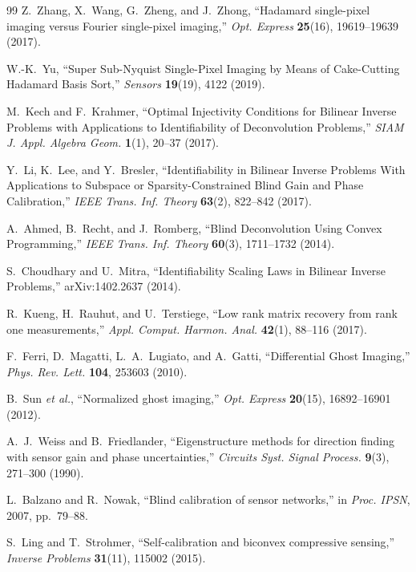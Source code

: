 \begin{thebibliography}{99}
Z.~Zhang, X.~Wang, G.~Zheng, and J.~Zhong, ``Hadamard single-pixel imaging versus Fourier single-pixel imaging,'' \emph{Opt. Express} \textbf{25}(16), 19619--19639 (2017).

W.-K.~Yu, ``Super Sub-Nyquist Single-Pixel Imaging by Means of Cake-Cutting Hadamard Basis Sort,'' \emph{Sensors} \textbf{19}(19), 4122 (2019).

M.~Kech and F.~Krahmer, ``Optimal Injectivity Conditions for Bilinear Inverse Problems with Applications to Identifiability of Deconvolution Problems,'' \emph{SIAM J. Appl. Algebra Geom.} \textbf{1}(1), 20--37 (2017).

Y.~Li, K.~Lee, and Y.~Bresler, ``Identifiability in Bilinear Inverse Problems With Applications to Subspace or Sparsity-Constrained Blind Gain and Phase Calibration,'' \emph{IEEE Trans. Inf. Theory} \textbf{63}(2), 822--842 (2017).

A.~Ahmed, B.~Recht, and J.~Romberg, ``Blind Deconvolution Using Convex Programming,'' \emph{IEEE Trans. Inf. Theory} \textbf{60}(3), 1711--1732 (2014).

S.~Choudhary and U.~Mitra, ``Identifiability Scaling Laws in Bilinear Inverse Problems,'' arXiv:1402.2637 (2014).

R.~Kueng, H.~Rauhut, and U.~Terstiege, ``Low rank matrix recovery from rank one measurements,'' \emph{Appl. Comput. Harmon. Anal.} \textbf{42}(1), 88--116 (2017).

F.~Ferri, D.~Magatti, L.~A.~Lugiato, and A.~Gatti, ``Differential Ghost Imaging,'' \emph{Phys. Rev. Lett.} \textbf{104}, 253603 (2010).

B.~Sun \emph{et al.}, ``Normalized ghost imaging,'' \emph{Opt. Express} \textbf{20}(15), 16892--16901 (2012).

A.~J.~Weiss and B.~Friedlander, ``Eigenstructure methods for direction finding with sensor gain and phase uncertainties,'' \emph{Circuits Syst. Signal Process.} \textbf{9}(3), 271--300 (1990).

L.~Balzano and R.~Nowak, ``Blind calibration of sensor networks,'' in \emph{Proc. IPSN}, 2007, pp.~79--88.

S.~Ling and T.~Strohmer, ``Self-calibration and biconvex compressive sensing,'' \emph{Inverse Problems} \textbf{31}(11), 115002 (2015).


\end{thebibliography}
